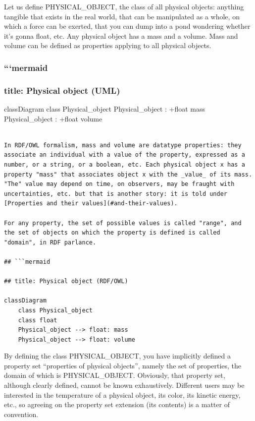 \documentclass[
  11pt,
]{article}
\begin{document}
Let us define PHYSICAL\_OBJECT, the class of all physical objects:
anything tangible that exists in the real world, that can be manipulated
as a whole, on which a force can be exerted, that you can dump into a
pond wondering whether it's gonna float, etc. Any physical object has a
mass and a volume. Mass and volume can be defined as properties applying
to all physical objects.

\hypertarget{mermaid}{%
\subsubsection{```mermaid}\label{mermaid}}

\hypertarget{title-physical-object-uml}{%
\subsubsection{title: Physical object
(UML)}\label{title-physical-object-uml}}

classDiagram class Physical\_object Physical\_object : +float mass
Physical\_object : +float volume

\begin{verbatim}

In RDF/OWL formalism, mass and volume are datatype properties: they associate an individual with a value of the property, expressed as a number, or a string, or a boolean, etc. Each physical object x has a property "mass" that associates object x with the _value_ of its mass. "The" value may depend on time, on observers, may be fraught with uncertainties, etc. but that is another story: it is told under [Properties and their values](#and-their-values).

For any property, the set of possible values is called "range", and the set of objects on which the property is defined is called "domain", in RDF parlance.

## ```mermaid

## title: Physical object (RDF/OWL)

classDiagram
    class Physical_object
    class float
    Physical_object --> float: mass
    Physical_object --> float: volume
\end{verbatim}

By defining the class PHYSICAL\_OBJECT, you have implicitly defined a
property set ``properties of physical objects'', namely the set of
properties, the domain of which is PHYSICAL\_OBJECT. Obviously, that
property set, although clearly defined, cannot be known exhaustively.
Different users may be interested in the temperature of a physical
object, its color, its kinetic energy, etc., so agreeing on the property
set extension (its contents) is a matter of convention.
\end{document}
